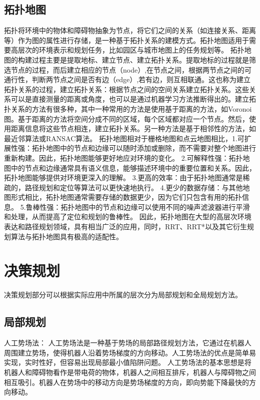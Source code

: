\subsection{拓扑地图}
拓扑将环境中的物体和障碍物抽象为节点，将它们之间的关系（如连接关系、距离等）作为图的属性进行存储，是一种基于拓扑关系的建模方式。拓扑地图适用于需要高层次的环境表示和规划任务，比如园区与城市地图上的任务规划等。
拓扑地图的构建过程主要是提取地标、建立节点、建立拓扑关系。提取地标的过程就是筛选节点的过程，而后建立相应的节点（node）,在节点之间，根据两节点之间的可通行性，判断两节点之间是否有边（edge）,若有边，则互相联通。这也称为建立拓扑关系的过程，建立拓扑关系：根据节点之间的空间关系建立拓扑关系。这些关系可以是直接测量的距离或角度，也可以是通过机器学习方法推断得出的。建立拓扑关系的方法有很多种，其中一种常用的方法是使用基于距离的方法，如Voronoi图。基于距离的方法将空间分成不同的区域，每个区域都对应一个节点。然后，使用距离信息将这些节点相连，建立拓扑关系。另一种方法是基于相邻性的方法，如最近邻算法或RANSAC算法。
拓扑地图相对于栅格地图和点云地图相比，1.可扩展性强：拓扑地图中的节点和边缘可以随时添加或删除，而不需要对整个地图进行重新构建。因此，拓扑地图能够更好地应对环境的变化。
2.可解释性强：拓扑地图中的节点和边缘通常具有语义信息，能够描述环境中的重要位置和关系。因此，拓扑地图能够提供对环境更深入的理解。
3.更高的效率：由于拓扑地图通常是稀疏的，路径规划和定位等算法可以更快速地执行。
4.更少的数据存储：与其他地图形式相比，拓扑地图通常需要存储的数据更少，因为它们只包含有用的拓扑信息。
5.鲁棒性强：拓扑地图中的节点和边缘可以使用不同的噪声滤波器进行平滑和处理，从而提高了定位和规划的鲁棒性。
因此，拓扑地图在大型的高层次环境表达和路径规划领域，具有相当广泛的应用，同时，RRT\cite{lavalle1998rapidly}、RRT*\cite{karaman2011sampling}以及其它衍生规划算法与拓扑地图具有极高的适配性。
\section{决策规划}
决策规划部分可以根据实际应用中所属的层次分为局部规划和全局规划方法。

\subsection{局部规划}
人工势场法：
人工势场法是一种基于势场的局部路径规划方法，它通过在机器人周围建立势场，使得机器人沿着势场梯度的方向移动。人工势场法的优点是简单易实现，实时性好，但容易出现局部最小值陷阱问题。
人工势场法的基本思想是将机器人和障碍物看作是带电荷的物体，机器人之间相互排斥，机器人与障碍物之间相互吸引。机器人在势场中的移动方向是势场梯度的方向，即向势能下降最快的方向移动。

